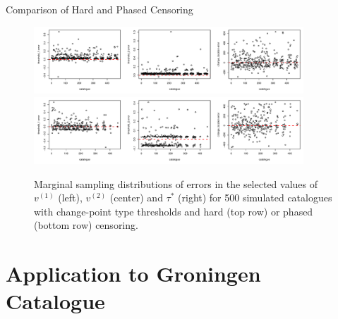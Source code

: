 \begin{frame}{Comparison of Hard and Phased Censoring}
    \begin{figure}[hbt]
    \centering
    \includegraphics[width = 0.9\textwidth, page = 2]{images/changepoint_sim_hard/selection_errors_II_changepoint_hard.pdf}\\
     \includegraphics[width = 0.9\textwidth, page = 2]{images/changepoint_sim_phased/selection_errors_II_changepoint_phased.pdf} 
    \caption{Marginal sampling distributions of errors in the selected values of $v^{(1)}$ (left),  $v^{(2)}$ (center) and $\tau^*$ (right) for 500 simulated catalogues with change-point type thresholds and hard (top row) or phased (bottom row) censoring. }
    \label{fig:changepoint_errors}
\end{figure}
\end{frame}

\section{Application to Groningen Catalogue}

